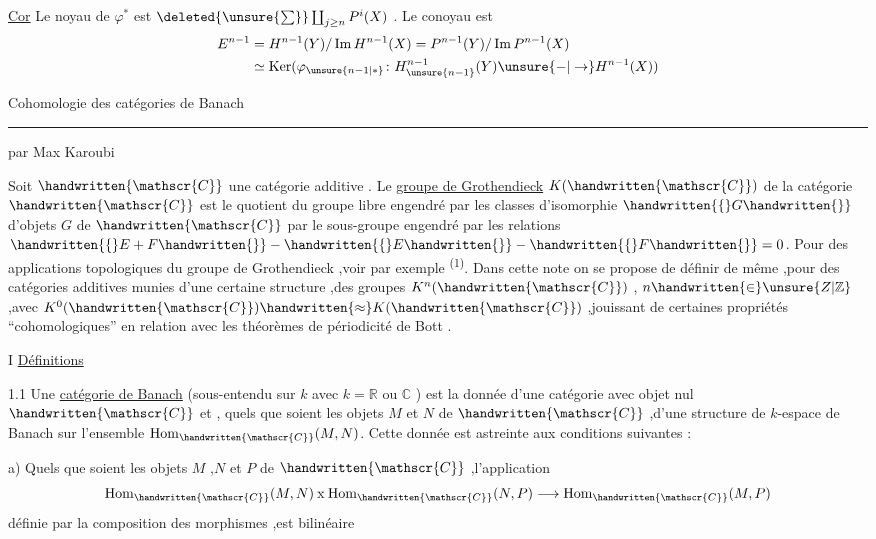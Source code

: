 \uline{Cor} \quad Le noyau de $\varphi^*$ est  $\deleted{\unsure{\sum}}\coprod_{j\geq n}P^i(X)$ . Le conoyau est
\[
\begin{aligned}
E^{n-1}&=H^{n-1}(Y)/\operatorname{Im}H^{n-1}(X)=P^{n-1}(Y)/\operatorname{Im}P^{n-1}(X)\\
 &\simeq\operatorname{Ker}(\varphi_{\unsure{n-1|*}}\colon H_{\unsure{n-1}}^{n-1}(Y)\unsure{-|\to}H^{n-1}(X))
\end{aligned}
\]

\margin{\handwritten{$\uparrow$}}
\begin{center}
Cohomologie des catégories de Banach

\rule{8em}{0.4pt}

par Max Karoubi
\end{center}

Soit $\handwritten{\mathscr{C}}$ une catégorie additive \handwritten{\textsuperscript{$(*)$}}. Le \uline{groupe de Grothendieck} $K(\handwritten{\mathscr{C}})$ de la catégorie $\handwritten{\mathscr{C}}$ est le quotient du groupe libre engendré par les classes d'isomorphie $\handwritten{\{}G\handwritten{\}}$ d'objets $G$ de $\handwritten{\mathscr{C}}$ par le sous-groupe engendré par les relations $\handwritten{\{}E+F\handwritten{\}}-\handwritten{\{}E\handwritten{\}}-\handwritten{\{}F\handwritten{\}}=0$. Pour des applications topologiques du groupe de Grothendieck ,voir par exemple \textsuperscript{(1)}. Dans cette note on se propose de définir de même ,pour des catégories additives munies d'une certaine structure ,des groupes $K^n(\handwritten{\mathscr{C}})$ , $n\handwritten{\in}\unsure{Z|\mathbb{Z}}$ ,avec $K^0(\handwritten{\mathscr{C}})\handwritten{\approx}K(\handwritten{\mathscr{C}})$ ,jouissant de certaines propriétés ``cohomologiques'' en relation avec les théorèmes de périodicité de Bott .

I \qquad \uline{Définitions}

1.1 \quad Une \uline{catégorie de Banach} (sous-entendu sur $k$ avec $k=\mathbb{R}$ ou $\mathbb{C}$ ) est la donnée d'une catégorie avec objet nul $\handwritten{\mathscr{C}}$ et , quels que soient les objets $M$ et $N$ de $\handwritten{\mathscr{C}}$ ,d'une structure de $k$-espace de Banach sur l'ensemble $\operatorname{Hom}_{\handwritten{\mathscr{C}}}(M,N)$. Cette donnée est astreinte aux conditions suivantes :

a) Quels que soient les objets $M$ ,$N$ et $P$ de $\handwritten{\mathscr{C}}$ ,l'application
\[
\operatorname{Hom}_{\handwritten{\mathscr{C}}}(M,N)\mathbin{\mathrm{x}}\operatorname{Hom}_{\handwritten{\mathscr{C}}}(N,P)\longrightarrow\operatorname{Hom}_{\handwritten{\mathscr{C}}}(M,P)
\]
définie par la composition des morphismes ,est bilinéaire


